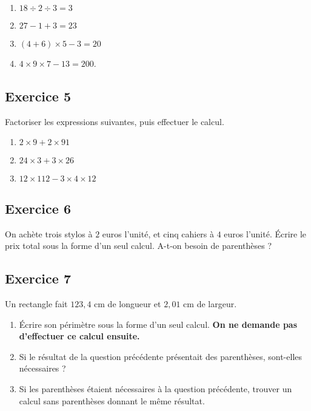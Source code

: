 \documentclass[14 pt]{extarticle}
\theoremstyle{plain}
\begin{document}
\begin{enumerate}
\item $18 \div 2 \div 3 = 3$
\item $27 - 1 + 3 = 23$
\item $(4+ 6 )\times 5-3 = 20$
\item $4 \times 9\times 7 - 13 = 200$. 
\end{enumerate}

\subsection*{Exercice 5}
Factoriser les expressions suivantes, puis effectuer le calcul. 

\begin{enumerate}
\item $2\times 9 + 2\times 91$
\item $24 \times 3 + 3 \times 26$
\item $12\times 112 - 3\times 4 \times 12$
\end{enumerate}

\subsection*{Exercice 6}

On achète trois stylos à $2$ euros l'unité, et cinq cahiers à $4$ euros l'unité. Écrire le prix total sous la forme d'un seul calcul. A-t-on besoin de parenthèses ? 

\subsection*{Exercice 7}

Un rectangle fait $123,4$ cm de longueur et $2,01$ cm de largeur. 
\begin{enumerate}
\item Écrire son périmètre sous la forme d'un seul calcul. \textbf{On ne demande pas d'effectuer ce calcul ensuite.}
\item Si le résultat de la question précédente présentait des parenthèses, sont-elles nécessaires ? 
\item Si les parenthèses étaient nécessaires à la question précédente, trouver un calcul sans parenthèses donnant le même résultat. 
\end{enumerate}

 	
\end{document}
